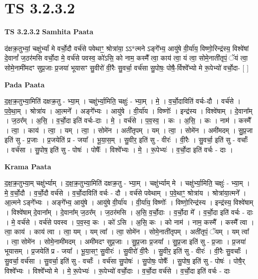 \documentclass[17pt]{extarticle}
\begin{document}
\section{ TS 3.2.3.2 }

\textbf{TS 3.2.3.2 } \newline
\textbf{Samhita Paata} \newline

द॑क्षक्र॒तुभ्यां॒ चक्षु॑र्भ्यां मे वर्चो॒दौ वर्च॑से पवेथाꣳ॒॒ श्रोत्रा॑या॒ ऽऽ*त्मने ऽङ्गे᳚भ्य॒ आयु॑षे वी॒र्या॑य॒ विष्णो॒रिन्द्र॑स्य॒ विश्वे॑षां दे॒वानां᳚ ज॒ठर॑मसि वर्चो॒दा मे॒ वर्च॑से पवस्व॒ को॑ऽसि॒ को नाम॒ कस्मै᳚ त्वा॒ काय॑ त्वा॒ यं त्वा॒ सोमे॒नाती॑तृपं॒ ॅयं त्वा॒ सोमे॒नामी॑मदꣳ सुप्र॒जाः प्र॒जया॑ भूयासꣳ सु॒वीरो॑ वी॒रैः सु॒वर्चा॒ वर्च॑सा सु॒पोषः॒ पोषै॒-र्विश्वे᳚भ्यो मे रू॒पेभ्यो॑ वर्चो॒दा- [  ] \newline

\textbf{Pada Paata} \newline

द॒क्ष॒क्र॒तुभ्या॒मिति॑ दक्षक्र॒तु - भ्या॒म् । चक्षु॑र्भ्या॒मिति॒ चक्षुः॑ - भ्या॒म् । मे॒ । व॒र्चो॒दाविति॑ वर्चः-दौ । वर्च॑से । प॒वे॒था॒म् । श्रोत्रा॑य । आ॒त्मने᳚ । अङ्गे᳚भ्यः । आयु॑षे । वी॒र्या॑य । विष्णोः᳚ । इन्द्र॑स्य । विश्वे॑षाम् । दे॒वाना᳚म् । ज॒ठर᳚म् । अ॒सि॒ । व॒र्चो॒दा इति॑ वर्चः-दाः । मे॒ । वर्च॑से । प॒व॒स्व॒ । कः । अ॒सि॒ । कः । नाम॑ । कस्मै᳚ । त्वा॒ । काय॑ । त्वा॒ । यम् । त्वा॒ । सोमे॑न । अती॑तृपम् । यम् । त्वा॒ । सोमे॑न । अमी॑मदम् । सु॒प्र॒जा इति॑ सु - प्र॒जाः । प्र॒जयेति॑ प्र - जया᳚ । भू॒या॒स॒म् । सु॒वीर॒ इति॑ सु - वीरः॑ । वी॒रैः । सु॒वर्चा॒ इति॑ सु - वर्चाः᳚ । वर्च॑सा । सु॒पोष॒ इति॑ सु - पोषः॑ । पोषैः᳚ । विश्वे᳚भ्यः । मे॒ । रू॒पेभ्यः॑ । व॒र्चो॒दा इति॑ वर्चः - दाः ।  \newline


\textbf{Krama Paata} \newline

द॒क्ष॒क्र॒तुभ्या॒म् चक्षु॑र्भ्याम् । द॒क्ष॒क्र॒तुभ्या॒मिति॑ दक्षक्र॒तु - भ्या॒म् । चक्षु॑र्भ्याम् मे । चक्षु॑र्भ्या॒मिति॒ चक्षुः॑ - भ्या॒म् । मे॒ व॒र्चो॒दौ । व॒र्चो॒दौ वर्च॑से । व॒र्चो॒दाविति॑ वर्चः - दौ । वर्च॑से पवेथाम् । प॒वे॒थाꣳ॒॒ श्रोत्रा॑य । श्रोत्रा॑या॒त्मने᳚ । आ॒त्मने ऽङ्गे᳚भ्यः । अङ्गे᳚भ्य॒ आयु॑षे । आयु॑षे वी॒र्या॑य । वी॒र्या॑य॒ विष्णोः᳚ । विष्णो॒रिन्द्र॑स्य । इन्द्र॑स्य॒ विश्वे॑षाम् । विश्वे॑षाम् दे॒वाना᳚म् । दे॒वाना᳚म् ज॒ठर᳚म् । ज॒ठर॑मसि । अ॒सि॒ व॒र्चो॒दाः । व॒र्चो॒दा मे᳚ । व॒र्चो॒दा इति॑ वर्चः - दाः । मे॒ वर्च॑से । वर्च॑से पवस्व । प॒व॒स्व॒ कः । को॑ ऽसि । अ॒सि॒ कः । को नाम॑ । नाम॒ कस्मै᳚ । कस्मै᳚ त्वा । त्वा॒ काय॑ । काय॑ त्वा । त्वा॒ यम् । यम् त्वा᳚ । त्वा॒ सोमे॑न । सोमे॒नाती॑तृपम् । अती॑तृपं॒ ॅयम् । यम् त्वा᳚ । त्वा॒ सोमे॑न । सोमे॒नामी॑मदम् । अमी॑मदꣳ सुप्र॒जाः । सु॒प्र॒जाः प्र॒जया᳚ । सु॒प्र॒जा इति॑ सु - प्र॒जाः । प्र॒जया॑ भूयासम् । प्र॒जयेति॑ प्र - जया᳚ । भू॒या॒सꣳ॒॒ सु॒वीरः॑ । सु॒वीरो॑ वी॒रैः । सु॒वीर॒ इति॑ सु - वीरः॑ । वी॒रैः सु॒वर्चाः᳚ । सु॒वर्चा॒ वर्च॑सा । सु॒वर्चा॒ इति॑ सु - वर्चाः᳚ । वर्च॑सा सु॒पोषः॑ । सु॒पोषः॒ पोषैः᳚ । सु॒पोष॒ इति॑ सु - पोषः॑ । पोषै॒र् विश्वे᳚भ्यः । विश्वे᳚भ्यो मे । मे॒ रू॒पेभ्यः॑ । रू॒पेभ्यो॑ वर्चो॒दाः । व॒र्चो॒दा वर्च॑से । व॒र्चो॒दा इति॑ वर्चः - दाः \newline
\end{document}
